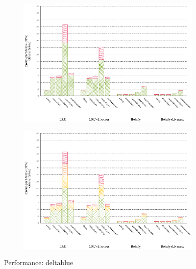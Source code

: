 \begin{figure}[!ht]
  \begin{subfigure}[b]{0.5\textwidth}%
    \includegraphics[width=\textwidth]{figs/plots/perf-misses-deltablue.eps}
  \end{subfigure}%
  \begin{subfigure}[b]{0.5\textwidth}%
    \includegraphics[width=\textwidth]{figs/plots/perf-deltablue.eps}
  \end{subfigure}%
  \caption{Performance: deltablue}
  \label{fig:performance-deltablue}
\end{figure}

